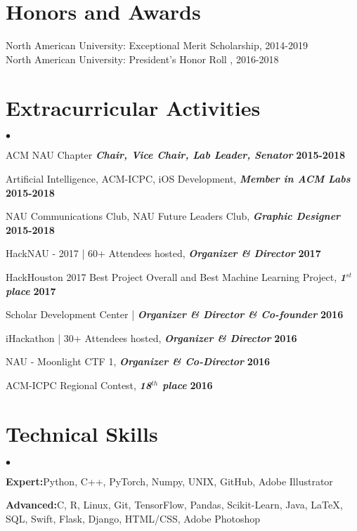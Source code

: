 \documentclass[margin,line]{res}
\newenvironment{list2}{
  \begin{list}{$\bullet$}{%
      \setlength{\itemsep}{0in}
      \setlength{\parsep}{0in} \setlength{\parskip}{0in}
      \setlength{\topsep}{0in} \setlength{\partopsep}{0in} 
      \setlength{\leftmargin}{0.2in}}}{\end{list}}
\begin{document}
\begin{resume}
\section{\sc Honors and Awards}

North American University: Exceptional Merit Scholarship, 2014-2019\\
North American University: President's Honor Roll , 2016-2018


\section{\sc Extracurricular Activities}
\begin{list2}
\item ACM NAU Chapter {\em \textbf{Chair, Vice Chair, Lab Leader, Senator}} \hfill {\bf 2015-2018}
\item Artificial Intelligence, ACM-ICPC, iOS Development, {\em \textbf{Member in ACM Labs}} \hfill {\bf 2015-2018}
\item NAU Communications Club, NAU Future Leaders Club, {\em \textbf{Graphic Designer}} \hfill  {\bf 2015-2018}
\item HackNAU - 2017 | 60+ Attendees hosted, {\em \textbf{Organizer \& Director}} \hfill {\bf 2017}
\item HackHouston 2017 Best Project Overall and Best Machine Learning Project, {\em \textbf{1$^{st}$ place}} \hfill  {\bf 2017}
\item Scholar Development Center | {\em \textbf{Organizer \& Director \& Co-founder}} \hfill {\bf 2016} 
\item iHackathon | 30+ Attendees hosted, {\em \textbf{Organizer \& Director}} \hfill {\bf 2016} 
\item NAU - Moonlight CTF 1, {\em \textbf{Organizer \& Co-Director}} \hfill {\bf 2016}
\item ACM-ICPC Regional Contest, {\em \textbf{18$^{th}$ place}} \hfill  {\bf 2016}
\end{list2}

\section{\sc Technical Skills} 
\begin{list2}
\item{\textbf{Expert:}\space Python, C++, PyTorch, Numpy, UNIX, GitHub, Adobe Illustrator}
\item{\textbf{Advanced:}\space C, R, Linux, Git, TensorFlow, Pandas, Scikit-Learn, Java, \LaTeX, SQL, Swift, Flask, Django, HTML/CSS, Adobe Photoshop}
\end{list2}


\end{resume}
\end{document}
